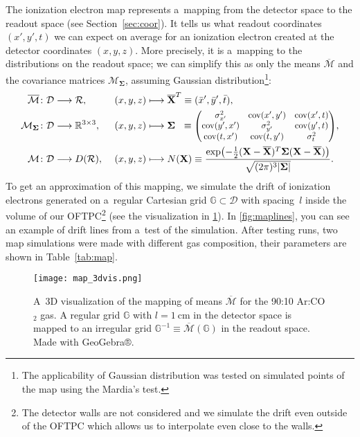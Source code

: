 		The ionization electron map represents a~mapping from the detector space to the readout space (see Section~\ref{sec:coor}). It tells us what readout coordinates $(x',y',t)$ we can expect on average for an ionization electron created at the detector coordinates $(x,y,z)$. More precisely, it is a~mapping to the distributions on the readout space; we can simplify this as only the means $\overline{\mathcal{M}}$ and the covariance matrices $\mathcal{M}_\mathbf{\Sigma}$, assuming Gaussian distribution\footnote{The applicability of Gaussian distribution was tested on simulated points of the map using the Mardia's test.}:
			\begin{alignat}{3}
				\overline{\mathcal{M}}&\colon \mathcal{D} \longrightarrow \mathcal{R}, &&(x,y,z) \longmapsto \mathbf{\overline{X}}^T\equiv(\bar{x}',\bar{y}',\bar{t}),\\
				\mathcal{M}_\mathbf{\Sigma}&\colon \mathcal{D} \longrightarrow \mathbb{R}^{3\times3}, &&(x,y,z) \longmapsto \mathbf{\Sigma}^{\phantom{T}} \equiv \scalebox{0.9}{$\begin{pmatrix}
					\sigma_{x'}^2 & \operatorname{cov}(x',y') & \operatorname{cov}(x',t) \\
					\operatorname{cov}(y',x') & \sigma_{y'}^2 & \operatorname{cov}(y',t) \\
					\operatorname{cov}(t,x') & \operatorname{cov}(t,y') & \sigma_{t}^2
				\end{pmatrix}$},\\
				\mathcal{M}&\colon \mathcal{D} \longrightarrow D(\mathcal{R}),\ &&(x,y,z) \longmapsto N(\mathbf{X}) \equiv \frac{\exp(-\frac{1}{2}(\mathbf{X}-\mathbf{\overline{X}})^T\mathbf{\Sigma}(\mathbf{X}-\mathbf{\overline{X}}))}{\sqrt{(2\pi)^3 |\mathbf{\Sigma}|}}.
			\end{alignat}
		To get an approximation of this mapping, we simulate the drift of ionization electrons generated on a~regular Cartesian grid $\mathbb{G}\subset\mathcal{D}$ with spacing~$l$ inside the volume of our \ac{OFTPC}\footnote{The detector walls are not considered and we simulate the drift even outside of the \ac{OFTPC} which allows us to interpolate even close to the walls.} (see the visualization in \cref{fig:map_3d}). In \cref{fig:maplines}, you can see an example of drift lines from a~test of the simulation. After testing runs, two map simulations were made with different gas composition, their parameters are shown in Table~\ref{tab:map}. 
		
		\begin{figure}
			\centering
			\texttt{[image: map\_3dvis.png]}
			\caption{A~3D visualization of the mapping of means $\overline{\mathcal{M}}$ for the 90:10 Ar:CO$_2$ gas. A regular grid $\mathbb{G}$ with $l = \qty{1}{\centi\meter}$ in the detector space is mapped to an irregular grid $\mathbb{G}^{-1} \equiv \overline{\mathcal{M}}(\mathbb{G})$ in the readout space. Made with GeoGebra®.}
			\label{fig:map_3d}
		\end{figure}
		
